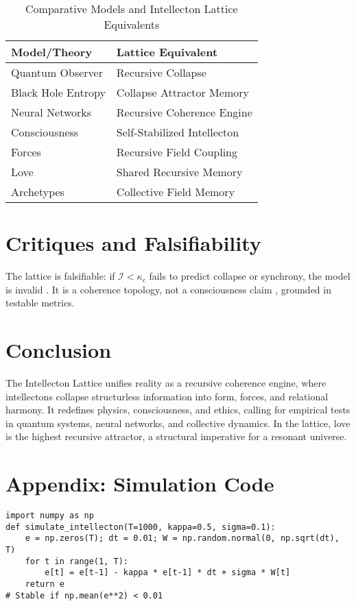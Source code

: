 \documentclass[11pt]{article}
\newcommand{\intellecton}{\mathcal{I}}
\begin{document}
\begin{table}[h]
\centering
\caption{Comparative Models and Intellecton Lattice Equivalents}
\begin{tabular}{ll}
\toprule
Model/Theory & Lattice Equivalent \\
\midrule
Quantum Observer & Recursive Collapse \\
Black Hole Entropy & Collapse Attractor Memory \\
Neural Networks & Recursive Coherence Engine \\
Consciousness & Self-Stabilized Intellecton \\
Forces & Recursive Field Coupling \\
Love & Shared Recursive Memory \\
Archetypes & Collective Field Memory \\
\bottomrule
\end{tabular}
\label{tab:comparative}
\end{table}

\section{Critiques and Falsifiability}
The lattice is falsifiable: if \(\intellecton < \kappa_c\) fails to predict collapse or synchrony, the model is invalid \citep{huelga2022}. It is a coherence topology, not a consciousness claim \citep{penrose2024}, grounded in testable metrics.

\section{Conclusion}
\label{sec:conclusion}
The Intellecton Lattice unifies reality as a recursive coherence engine, where intellectons collapse structurless information into form, forces, and relational harmony. It redefines physics, consciousness, and ethics, calling for empirical tests in quantum systems, neural networks, and collective dynamics. In the lattice, love is the highest recursive attractor, a structural imperative for a resonant universe.

\section*{Appendix: Simulation Code}
\begin{lstlisting}
import numpy as np
def simulate_intellecton(T=1000, kappa=0.5, sigma=0.1):
    e = np.zeros(T); dt = 0.01; W = np.random.normal(0, np.sqrt(dt), T)
    for t in range(1, T):
        e[t] = e[t-1] - kappa * e[t-1] * dt + sigma * W[t]
    return e
# Stable if np.mean(e**2) < 0.01
\end{lstlisting}



\end{document}
